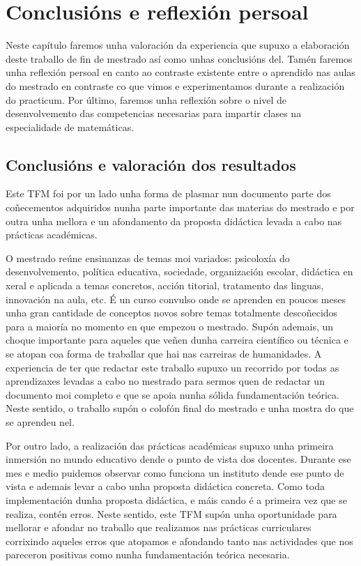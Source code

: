 

\chapter{Conclusións e reflexión persoal}\label{chap:valoracion}

Neste capítulo faremos unha valoración da experiencia que supuxo a elaboración deste traballo de fin de mestrado así como unhas conclusións del. Tamén faremos unha reflexión persoal en canto ao contraste existente entre o aprendido nas aulas do mestrado en contraste co que vimos e experimentamos durante a realización do practicum. Por último, faremos unha reflexión sobre o nivel de desenvolvemento das competencias necesarias para impartir clases na especialidade de matemáticas.

\section{Conclusións e valoración dos resultados}

Este TFM foi por un lado unha forma de plasmar nun documento parte dos coñecementos adquiridos nunha parte importante das materias do mestrado e por outra unha mellora e un afondamento da proposta didáctica levada a cabo nas prácticas académicas.

O mestrado reúne ensinanzas de temas moi variados: psicoloxía do desenvolvemento, política educativa, sociedade, organización escolar, didáctica en xeral e aplicada a temas concretos, acción titorial, tratamento das linguas, innovación na aula, etc. É un curso convulso onde se aprenden en poucos meses unha gran cantidade de conceptos novos sobre temas totalmente descoñecidos para a maioría no momento en que empezou o mestrado. Supón ademais, un choque importante para aqueles que veñen dunha carreira científico ou técnica e se atopan coa forma de traballar que hai nas carreiras de humanidades. A experiencia de ter que redactar este traballo supuxo un recorrido por todas as aprendizaxes levadas a cabo no mestrado para sermos quen de redactar un documento moi completo e que se apoia nunha sólida fundamentación teórica. Neste sentido, o traballo supón o colofón final do mestrado e unha mostra do que se aprendeu nel.

Por outro lado, a realización das prácticas académicas supuxo unha primeira inmersión no mundo educativo dende o punto de vista dos docentes. Durante ese mes e medio puidemos observar como funciona un instituto dende ese punto de vista e ademais levar a cabo unha proposta didáctica concreta. Como toda implementación dunha proposta didáctica, e máis cando é a primeira vez que se realiza, contén erros. Neste sentido, este TFM supón unha oportunidade para mellorar e afondar no traballo que realizamos nas prácticas curriculares corrixindo aqueles erros que atopamos e afondando tanto nas actividades que nos pareceron positivas como nunha fundamentación teórica necesaria.

